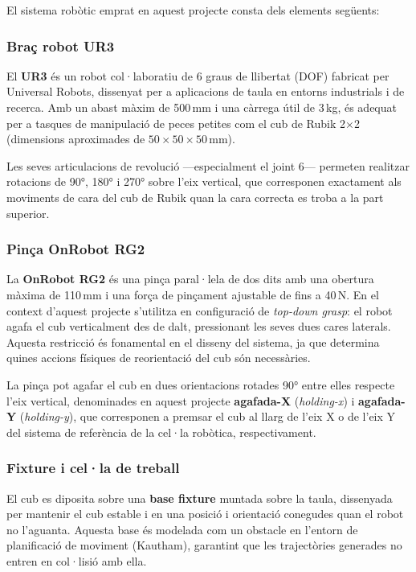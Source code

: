\documentclass[12pt, a4paper]{article}
\begin{document}
El sistema robòtic emprat en aquest projecte consta dels elements següents:

\subsubsection{Braç robot UR3}

El \textbf{UR3} és un robot col·laboratiu de 6 graus de llibertat (DOF) fabricat per Universal Robots, dissenyat per a aplicacions de taula en entorns industrials i de recerca. Amb un abast màxim de 500\,mm i una càrrega útil de 3\,kg, és adequat per a tasques de manipulació de peces petites com el cub de Rubik 2$\times$2 (dimensions aproximades de $50 \times 50 \times 50$\,mm).

Les seves articulacions de revolució —especialment el joint 6— permeten realitzar rotacions de 90°, 180° i 270° sobre l'eix vertical, que corresponen exactament als moviments de cara del cub de Rubik quan la cara correcta es troba a la part superior.

\subsubsection{Pinça OnRobot RG2}

La \textbf{OnRobot RG2} és una pinça paral·lela de dos dits amb una obertura màxima de 110\,mm i una força de pinçament ajustable de fins a 40\,N. En el context d'aquest projecte s'utilitza en configuració de \textit{top-down grasp}: el robot agafa el cub verticalment des de dalt, pressionant les seves dues cares laterals. Aquesta restricció és fonamental en el disseny del sistema, ja que determina quines accions físiques de reorientació del cub són necessàries.

La pinça pot agafar el cub en dues orientacions rotades 90° entre elles respecte l'eix vertical, denominades en aquest projecte \textbf{agafada-X} (\textit{holding-x}) i \textbf{agafada-Y} (\textit{holding-y}), que corresponen a premsar el cub al llarg de l'eix X o de l'eix Y del sistema de referència de la cel·la robòtica, respectivament.

\subsubsection{Fixture i cel·la de treball}

El cub es diposita sobre una \textbf{base fixture} muntada sobre la taula, dissenyada per mantenir el cub estable i en una posició i orientació conegudes quan el robot no l'aguanta. Aquesta base és modelada com un obstacle en l'entorn de planificació de moviment (Kautham), garantint que les trajectòries generades no entren en col·lisió amb ella.
\end{document}
